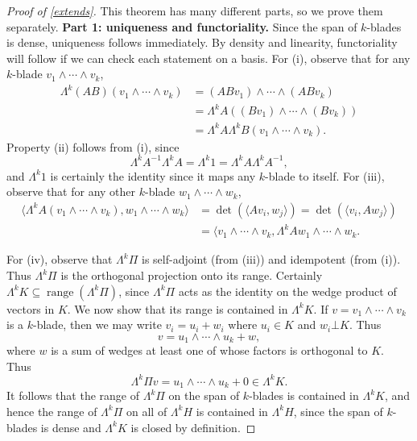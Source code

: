 \documentclass[12pt]{amsart}
\DeclareMathOperator{\range}{range}
\begin{document}
\begin{proof}[Proof of \cref{extends}]
This theorem has many different parts, so we prove them separately.
\textbf{Part 1: uniqueness and functoriality.} Since the span of $k$-blades is dense, uniqueness follows immediately. By density and linearity, functoriality will follow if we can check each statement on a basis. For (i), observe that for any $k$-blade $v_1\wedge \cdots \wedge v_k$,
\begin{align*}
\Lambda^k (AB)(v_1\wedge \cdots \wedge v_k) &= (ABv_1)\wedge \cdots \wedge (ABv_k)\\
&= \Lambda^k A((Bv_1)\wedge \cdots \wedge (Bv_k))\\
&= \Lambda^k A\Lambda^k B(v_1\wedge \cdots \wedge v_k).\end{align*}
Property (ii) follows from (i), since 
\[\Lambda^k A^{-1}\Lambda^k A = \Lambda^k 1 = \Lambda^k A \Lambda^k A^{-1},\] and $\Lambda^k 1$ is certainly the identity since it maps any $k$-blade to itself.
For (iii), observe that for any other $k$-blade $w_1\wedge \cdots \wedge w_k$,
\begin{align*}
\langle \Lambda^k A(v_1\wedge \cdots \wedge v_k),w_1\wedge \cdots \wedge w_k\rangle &= \det(\langle Av_i,w_j\rangle) = \det(\langle v_i,Aw_j\rangle)\\
&= \langle v_1\wedge \cdots \wedge v_k,\Lambda^k A w_1\wedge \cdots \wedge w_k.\end{align*}

For (iv), observe that $\Lambda^k \Pi$ is self-adjoint (from (iii)) and idempotent (from (i)). Thus $\Lambda^k \Pi$ is the orthogonal projection onto its range. Certainly $\Lambda^k K \subseteq \range(\Lambda^k \Pi)$, since $\Lambda^k \Pi$ acts as the identity on the wedge product of vectors in $K$. We now show that its range is contained in $\Lambda^k K$. If $v = v_1\wedge \cdots \wedge v_k$ is a $k$-blade, then we may write $v_i = u_i + w_i$ where $u_i \in K$ and $w_i \bot K$. Thus
\[v = u_1 \wedge \cdots \wedge u_k + w,\] where $w$ is a sum of wedges at least one of whose factors is orthogonal to $K$. Thus
\[\Lambda^k \Pi v = u_1 \wedge \cdots \wedge u_k + 0 \in \Lambda^k K.\] It follows that the range of $\Lambda^k \Pi$ on the span of $k$-blades is contained in $\Lambda^k K$, and hence the range of $\Lambda^k \Pi$ on all of $\Lambda^k H$ is contained in $\Lambda^k H$, since the span of $k$-blades is dense and $\Lambda^k K$ is closed by definition.


\end{proof}
\end{document}

